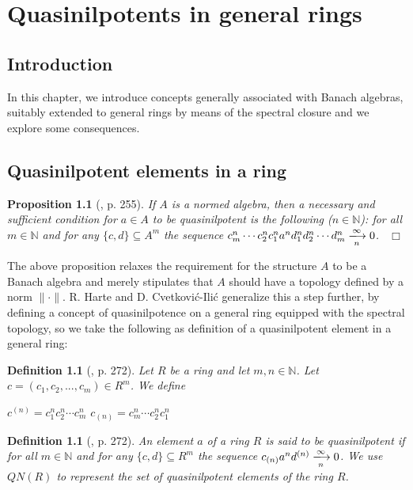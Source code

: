 \documentclass[12pt, oneside]{book}
\newtheorem{proposition}[theorem]{Proposition}
\newtheorem{definition}[theorem]{Definition}
\newcommand{\qed}{\hfill ~$\Box$\\}
\begin{document}
\chapter{Quasinilpotents in general rings}

\section{Introduction}

In this chapter, we introduce concepts generally associated with Banach algebras, suitably extended 
to general rings by means of the spectral closure and we explore some consequences. 


\section{Quasinilpotent elements in a ring}


\begin{proposition}[\cite{H1}, p. 255] 
\normalfont
\noindent If $A$ is a normed algebra, then a necessary and sufficient condition for $a \in A$ 
to be quasinilpotent is the following ($n \in \mathbb{N}$):
\vskip 0.3cm
\noindent for all $m \in \mathbb{N}$ and for any $\{c,d\} \subseteq A^m $ 
the sequence $ c_m^n \cdots c_2^nc_1^na^nd_1^nd_2^n \cdots d_m^n \xlongrightarrow[n]{\infty} 0$.
\qed
\end{proposition}
\vspace{-0.5cm}
\noindent The above proposition relaxes the requirement for the structure $A$ to be a Banach algebra 
and merely stipulates that $A$ should have a topology defined by a norm $\| \cdot \|$.
\vskip 0.3cm
\noindent R. Harte and D. Cvetkovi{\'c-Ili{\'c}} generalize this a step further, by defining 
a concept of quasinilpotence on a general ring equipped with the spectral topology, so we take the following as definition of a quasinilpotent element in a general ring:
\begin{definition}[\cite{CH3}, p. 272]
\normalfont
\noindent Let $R$ be a ring and let $m, n \in \mathbb{N}$. Let $c = (c_1, c_2, ..., c_m) \in R^{m}$. We define
\begin{center}
$c^{(n)} = c^n_1 c^n_2 \cdots c^n_m$ \quad {} \quad  $c_{(n)} = c^n_m \cdots c^n_2c^n_1$
\end{center}
\end{definition}

\begin{definition}[\cite{CH3}, p. 272] \label{DefnQN}
\normalfont
\noindent An element $a$ of a ring $R$ is said to be quasinilpotent if for all 
$m \in \mathbb{N}$ and for any $\{c,d\} \subseteq R^m $ the sequence 
$c_{(n)} a^n d^{(n)} \xlongrightarrow[n]{\infty} 0$. We use $QN(R)$ to represent the set 
of quasinilpotent elements of the ring $R$.

\end{definition}
\end{document}
